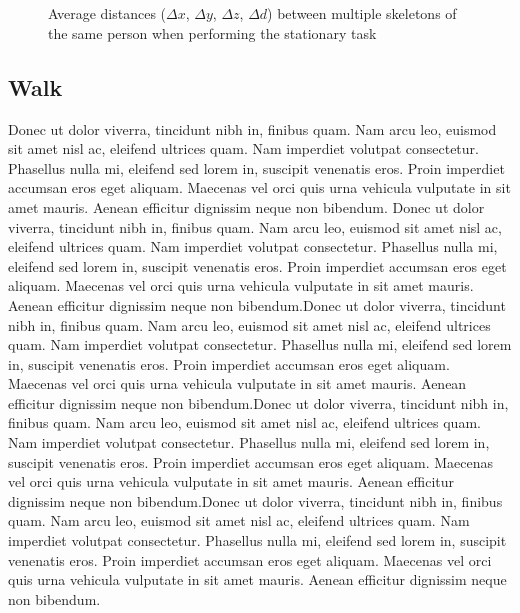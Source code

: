 \documentclass{sigchi}
\begin{document}
\begin{figure}
  \centering

   \\
   \\
  

  \caption{Average distances ($\Delta x$, $\Delta y$, $\Delta z$, $\Delta d$) between multiple skeletons
    of the same person when performing the stationary task}

  \label{fig:results_steps_3d}
\end{figure}

\subsection{Walk}

Donec ut dolor viverra, tincidunt nibh in, finibus quam. Nam arcu leo, euismod sit amet nisl ac, eleifend ultrices quam. Nam imperdiet volutpat consectetur. Phasellus nulla mi, eleifend sed lorem in, suscipit venenatis eros. Proin imperdiet accumsan eros eget aliquam. Maecenas vel orci quis urna vehicula vulputate in sit amet mauris. Aenean efficitur dignissim neque non bibendum.
Donec ut dolor viverra, tincidunt nibh in, finibus quam. Nam arcu leo, euismod sit amet nisl ac, eleifend ultrices quam. Nam imperdiet volutpat consectetur. Phasellus nulla mi, eleifend sed lorem in, suscipit venenatis eros. Proin imperdiet accumsan eros eget aliquam. Maecenas vel orci quis urna vehicula vulputate in sit amet mauris. Aenean efficitur dignissim neque non bibendum.Donec ut dolor viverra, tincidunt nibh in, finibus quam. Nam arcu leo, euismod sit amet nisl ac, eleifend ultrices quam. Nam imperdiet volutpat consectetur. Phasellus nulla mi, eleifend sed lorem in, suscipit venenatis eros. Proin imperdiet accumsan eros eget aliquam. Maecenas vel orci quis urna vehicula vulputate in sit amet mauris. Aenean efficitur dignissim neque non bibendum.Donec ut dolor viverra, tincidunt nibh in, finibus quam. Nam arcu leo, euismod sit amet nisl ac, eleifend ultrices quam. Nam imperdiet volutpat consectetur. Phasellus nulla mi, eleifend sed lorem in, suscipit venenatis eros. Proin imperdiet accumsan eros eget aliquam. Maecenas vel orci quis urna vehicula vulputate in sit amet mauris. Aenean efficitur dignissim neque non bibendum.Donec ut dolor viverra, tincidunt nibh in, finibus quam. Nam arcu leo, euismod sit amet nisl ac, eleifend ultrices quam. Nam imperdiet volutpat consectetur. Phasellus nulla mi, eleifend sed lorem in, suscipit venenatis eros. Proin imperdiet accumsan eros eget aliquam. Maecenas vel orci quis urna vehicula vulputate in sit amet mauris. Aenean efficitur dignissim neque non bibendum.
\end{document}
